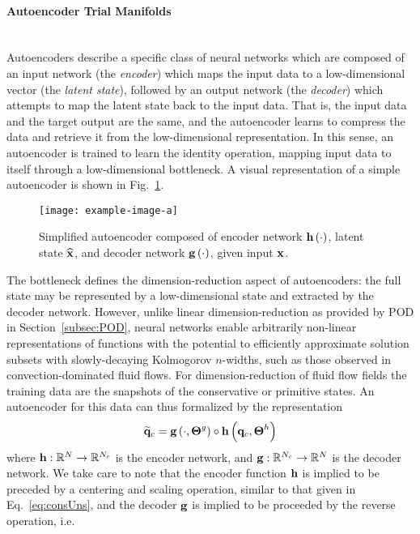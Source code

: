 \paragraph{Autoencoder Trial Manifolds}\mbox{}\\
%
Autoencoders describe a specific class of neural networks which are composed of an input network (the \textit{encoder}) which maps the input data to a low-dimensional vector (the \textit{latent state}), followed by an output network (the \textit{decoder}) which attempts to map the latent state back to the input data. That is, the input data and the target output are the same, and the autoencoder learns to compress the data and retrieve it from the low-dimensional representation. In this sense, an autoencoder is trained to learn the identity operation, mapping input data to itself through a low-dimensional bottleneck. A visual representation of a simple autoencoder is shown in Fig.~\ref{fig:aeSample}. 
%
\begin{figure}
    \centering
    \texttt{[image: example-image-a]}
    \caption{\label{fig:aeSample}Simplified autoencoder composed of encoder network $\mathbf{h} \left(\cdot\right)$, latent state $\mathbf{\widehat{x}}$, and decoder network $\mathbf{g} \left(\cdot\right)$, given input $\mathbf{x}$.}
\end{figure}
%
The bottleneck defines the dimension-reduction aspect of autoencoders: the full state may be represented by a low-dimensional state and extracted by the decoder network. However, unlike linear dimension-reduction as provided by POD in Section~\ref{subsec:POD}, neural networks enable arbitrarily non-linear representations of functions with the potential to efficiently approximate solution subsets with slowly-decaying Kolmogorov $n$-widths, such as those observed in convection-dominated fluid flows. For dimension-reduction of fluid flow fields the training data are the snapshots of the conservative or primitive states. An autoencoder for this data can thus formalized by the representation
%
\begin{equation}
    \mathbf{\widetilde{q}}_c = \mathbf{g} \left(\cdot, \boldsymbol{\Theta}^{g}\right) \circ \mathbf{h} \left(\mathbf{q}_c, \boldsymbol{\Theta}^{h}\right)
\end{equation}
%
where $\mathbf{h}: \mathbb{R}^{N} \rightarrow \mathbb{R}^{N_c}$ is the encoder network, and $\mathbf{g}: \mathbb{R}^{N_c} \rightarrow \mathbb{R}^{N}$ is the decoder network. We take care to note that the encoder function $\mathbf{h}$ is implied to be preceded by a centering and scaling operation, similar to that given in Eq.~\ref{eq:consUns}, and the decoder $\mathbf{g}$ is implied to be proceeded by the reverse operation, i.e. 
